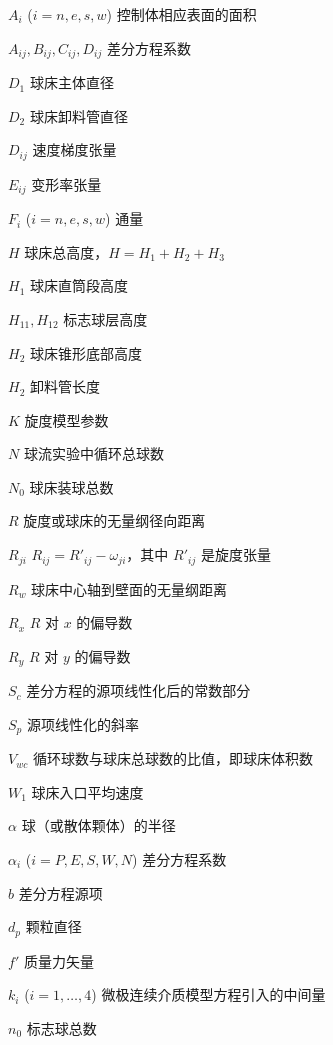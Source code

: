 \documentclass[degree=postdoc]{thuthesis}
\begin{document}
\tableofcontents

\begin{denotation}[10em]
  \item[$A_i$ ($i = n, e, s, w$)] 控制体相应表面的面积
  \item[$A_{ij}, B_{ij}, C_{ij}, D_{ij}$] 差分方程系数
  \item[$D_1$] 球床主体直径
  \item[$D_2$] 球床卸料管直径
  \item[$D_{ij}$] 速度梯度张量
  \item[$E_{ij}$] 变形率张量
  \item[$F_i$ ($i = n, e, s, w$)] 通量
  \item[$H$] 球床总高度，$H = H_1 + H_2 + H_3$
  \item[$H_1$] 球床直筒段高度
  \item[$H_{11}, H_{12}$] 标志球层高度
  \item[$H_2$] 球床锥形底部高度
  \item[$H_2$] 卸料管长度
  \item[$K$] 旋度模型参数
  \item[$N$] 球流实验中循环总球数
  \item[$N_0$] 球床装球总数
  \item[$R$] 旋度或球床的无量纲径向距离
  \item[$R_{ji}$] $R_{ij} = R'_{ij} - \omega_{ji}$，其中 $R'_{ij}$ 是旋度张量
  \item[$R_w$] 球床中心轴到壁面的无量纲距离
  \item[$R_x$] $R$ 对 $x$ 的偏导数
  \item[$R_y$] $R$ 对 $y$ 的偏导数
  \item[$S_c$] 差分方程的源项线性化后的常数部分
  \item[$S_p$] 源项线性化的斜率
  \item[$V_{wc}$] 循环球数与球床总球数的比值，即球床体积数
  \item[$W_1$] 球床入口平均速度
  \item[$\alpha$] 球（或散体颗体）的半径
  \item[$\alpha_i$ ($i = P, E, S, W, N$)] 差分方程系数
  \item[$b$] 差分方程源项
  \item[$d_p$] 颗粒直径
  \item[$f'$] 质量力矢量
  \item[$k_i$ ($i = 1, \dots, 4$)] 微极连续介质模型方程引入的中间量
  \item[$n_0$] 标志球总数
\end{denotation}
\end{document}
